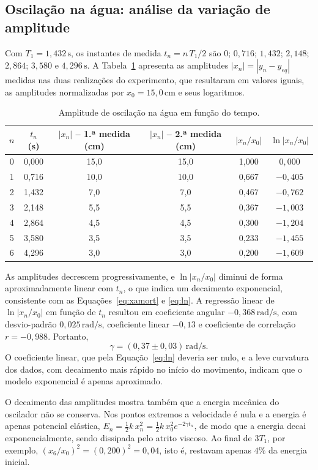 \documentclass[12pt, a4paper]{article}
\newcommand{\un}[1]{\,\mathrm{#1}}
\newcommand{\fonte}[1]{\par\vspace{2pt}{\footnotesize Fonte: #1}}
\begin{document}
\subsection{Oscilação na água: análise da variação de amplitude}

Com $T_1=1{,}432\un{s}$, os instantes de medida $t_n=n\,T_1/2$ são $0$; $0{,}716$; $1{,}432$; $2{,}148$; $2{,}864$; $3{,}580$ e $4{,}296\un{s}$. A Tabela~\ref{tab:decaimento} apresenta as amplitudes $|x_n|=|y_n-y_{eq}|$ medidas nas duas realizações do experimento, que resultaram em valores iguais, as amplitudes normalizadas por $x_0=15{,}0\un{cm}$ e seus logaritmos.

\begin{table}[H]
\centering
\caption{Amplitude de oscilação na água em função do tempo.}
\label{tab:decaimento}
\begin{tabular}{cccccc}
\toprule
$n$ & $t_n$ (s) & $|x_n|$ -- 1.ª medida (cm) & $|x_n|$ -- 2.ª medida (cm) & $|x_n/x_0|$ & $\ln|x_n/x_0|$ \\
\midrule
0 & 0,000 & 15,0 & 15,0 & 1,000 & $0{,}000$ \\
1 & 0,716 & 10,0 & 10,0 & 0,667 & $-0{,}405$ \\
2 & 1,432 & 7,0 & 7,0 & 0,467 & $-0{,}762$ \\
3 & 2,148 & 5,5 & 5,5 & 0,367 & $-1{,}003$ \\
4 & 2,864 & 4,5 & 4,5 & 0,300 & $-1{,}204$ \\
5 & 3,580 & 3,5 & 3,5 & 0,233 & $-1{,}455$ \\
6 & 4,296 & 3,0 & 3,0 & 0,200 & $-1{,}609$ \\
\bottomrule
\end{tabular}
\fonte{Elaborada pelos autores.}
\end{table}

As amplitudes decrescem progressivamente, e $\ln|x_n/x_0|$ diminui de forma aproximadamente linear com $t_n$, o que indica um decaimento exponencial, consistente com as Equações~\eqref{eq:xamort} e \eqref{eq:ln}. A regressão linear de $\ln|x_n/x_0|$ em função de $t_n$ resultou em coeficiente angular $-0{,}368\un{rad/s}$, com desvio-padrão $0{,}025\un{rad/s}$, coeficiente linear $-0{,}13$ e coeficiente de correlação $r=-0{,}988$. Portanto,
\[
\gamma=(0{,}37\pm0{,}03)\un{rad/s}.
\]
O coeficiente linear, que pela Equação~\eqref{eq:ln} deveria ser nulo, e a leve curvatura dos dados, com decaimento mais rápido no início do movimento, indicam que o modelo exponencial é apenas aproximado.

O decaimento das amplitudes mostra também que a energia mecânica do oscilador não se conserva. Nos pontos extremos a velocidade é nula e a energia é apenas potencial elástica, $E_n=\frac{1}{2}k\,x_n^2=\frac{1}{2}k\,x_0^2e^{-2\gamma t_n}$, de modo que a energia decai exponencialmente, sendo dissipada pelo atrito viscoso. Ao final de $3T_1$, por exemplo, $(x_6/x_0)^2=(0{,}200)^2=0{,}04$, isto é, restavam apenas $4\%$ da energia inicial.
\end{document}
